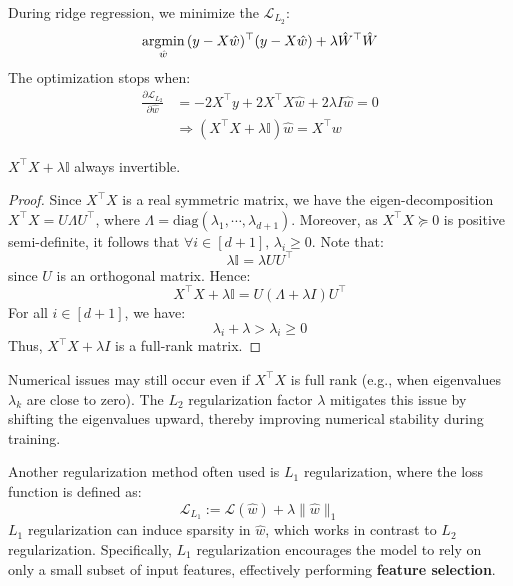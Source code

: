 \documentclass[../main]{subfiles}
\begin{document}
During ridge regression, we minimize the $\mathcal L_{L_2}$:
\begin{equation}
    \mathop{\text{argmin}}_{\hat w}\,(y-X\hat w)^\top(y-X\hat w)+\lambda\hat W^\top \hat W
\end{equation}
The optimization stops when:
\begin{align}
  \frac{\partial \mathcal L_{L_2}}{\partial \hat w}&=-2X^\top y+2X^\top X\hat w+2\lambda I\hat w=0\\
  &\Rightarrow (X^\top X+\lambda\mathbb I)\hat w=X^\top w
\end{align} 
\begin{proposition}
$X^\top X+\lambda\mathbb I$ always invertible.
\end{proposition}
\begin{proof}
  Since $X^\top X$ is a real symmetric matrix, we have the eigen-decomposition
  $X^\top X=U\Lambda U^\top$, where $\Lambda=\mathrm{diag}(\lambda_1,\cdots,\lambda_{d+1})$.  
  Moreover, as $X^\top X\succeq 0$ is positive semi-definite, it follows that $\forall i\in [d+1],\,\lambda_i\ge 0$.  
  Note that:
  \begin{equation}
      \lambda\mathbb I=\lambda UU^\top
  \end{equation}
  since $U$ is an orthogonal matrix. Hence:
  \begin{equation}
      X^\top X+\lambda\mathbb I=U(\Lambda+\lambda I)U^\top
  \end{equation}
  For all $i\in[d+1]$, we have:
  \begin{equation}
      \lambda_i+\lambda>\lambda_i\ge 0 
  \end{equation}
  Thus, $X^\top X+\lambda I$ is a full-rank matrix.
\end{proof}
\begin{remark}
  Numerical issues may still occur even if $X^\top X$ is full rank (e.g., when eigenvalues $\lambda_k$ are close to zero).  
  The $L_2$ regularization factor $\lambda$ mitigates this issue by shifting the eigenvalues upward, thereby improving numerical stability during training.
\end{remark}

Another regularization method often used is $L_1$ regularization, where the loss function is defined as:
\begin{equation}
    \mathcal L_{L_1}:=\mathcal L(\hat w)+\boxed{\lambda\|\hat w\|_1}
\end{equation}
$L_1$ regularization can induce sparsity in $\hat w$, which works in contrast to $L_2$ regularization.  
Specifically, $L_1$ regularization encourages the model to rely on only a small subset of input features, effectively performing \textbf{feature selection}.
\end{document}
